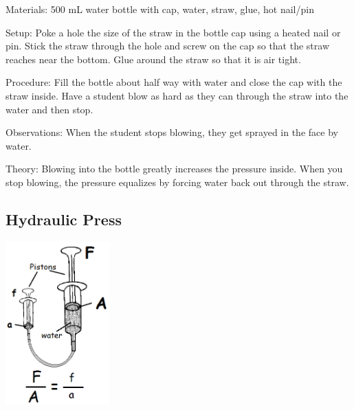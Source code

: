 \begin{multicols}{2}
\begin{description*}
\item[Materials:]{500 mL water bottle with cap, water, straw, glue, hot nail/pin}
\item[Setup:]{Poke a hole the size of the straw in the bottle cap using a heated nail or pin. Stick the straw through the hole and screw on the cap so that the straw reaches near the bottom. Glue around the straw so that it is air tight.}
\item[Procedure:]{Fill the bottle about half way with water and close the cap with the straw inside. Have a student blow as hard as they can through the straw into the water and then stop.}
\item[Observations:]{When the student stops blowing, they get sprayed in the face by water.}
\item[Theory:]{Blowing into the bottle greatly increases the pressure inside. When you stop blowing, the pressure equalizes by forcing water back out through the straw.}
\end{description*}

\subsection{Hydraulic Press}

\begin{center}
\includegraphics[width=0.3\textwidth]{./img/source/hydraulic-press.png}
\end{center}


\end{multicols}
